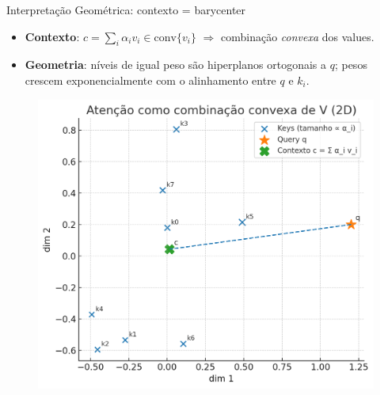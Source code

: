 \documentclass{beamer}
\begin{document}
\begin{frame}{Interpretação Geométrica: contexto = barycenter}
\begin{itemize}
  \item \textbf{Contexto}: $c=\sum_i \alpha_i v_i \in \mathrm{conv}\{v_i\}$ 
        $\Rightarrow$ combinação \emph{convexa} dos values.
  \item \textbf{Geometria}: níveis de igual peso são hiperplanos ortogonais a $q$; 
        pesos crescem exponencialmente com o alinhamento entre $q$ e $k_i$.
\end{itemize}
\begin{figure}
	\centering
  \includegraphics[height=0.7\textheight,keepaspectratio]{assets/rep_2D_cnv.png}
\end{figure}
\end{frame}
\end{document}
